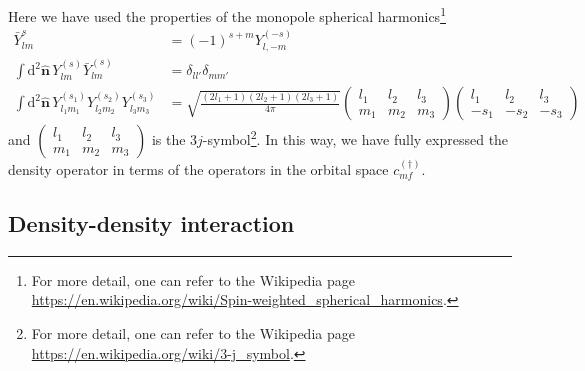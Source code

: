 \documentclass{timesjhep}
\begin{document}
Here we have used the properties of the monopole spherical harmonics\footnote{For more detail, one can refer to the Wikipedia page \url{https://en.wikipedia.org/wiki/Spin-weighted_spherical_harmonics}.}
\begin{subequations}
\begin{align}
    \bar{Y}_{lm}^{s}&=(-1)^{s+m}Y_{l,-m}^{(-s)}\\
    \int\mathrm{d}^2\hat{\mathbf{n}}\,Y_{lm}^{(s)}\bar{Y}_{lm}^{(s)}&=\delta_{ll'}\delta_{mm'}\\
    \int\mathrm{d}^2\hat{\mathbf{n}}\,Y_{l_1m_1}^{(s_1)}Y_{l_2m_2}^{(s_2)}Y_{l_3m_3}^{(s_3)}&=\sqrt{\frac{(2l_1+1)(2l_2+1)(2l_3+1)}{4\pi}}\begin{pmatrix}l_1&l_2&l_3\\m_1&m_2&m_3\end{pmatrix}\begin{pmatrix}l_1&l_2&l_3\\-s_1&-s_2&-s_3\end{pmatrix}     
\end{align} 
\end{subequations}
and $\begin{pmatrix}l_1&l_2&l_3\\m_1&m_2&m_3\end{pmatrix}$ is the $3j$-symbol\footnote{For more detail, one can refer to the Wikipedia page \url{https://en.wikipedia.org/wiki/3-j_symbol}.}. In this way, we have fully expressed the density operator in terms of the operators in the orbital space $c^{(\dagger)}_{mf}$. 

\subsection{Density-density interaction}
\label{sec:construct_denint}
\end{document}
